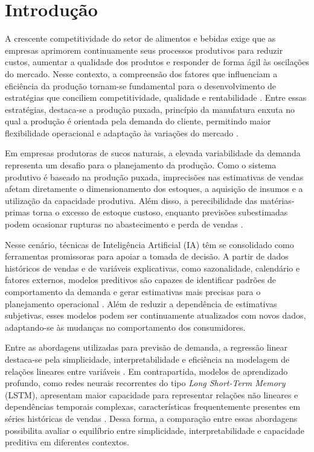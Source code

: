 \section{Introdução}
\label{sec-introducao}

A crescente competitividade do setor de alimentos e bebidas exige que as empresas aprimorem continuamente seus processos produtivos para reduzir custos, aumentar a qualidade dos produtos e responder de forma ágil às oscilações do mercado. Nesse contexto, a compreensão dos fatores que influenciam a eficiência da produção tornam-se fundamental para o desenvolvimento de estratégias que conciliem competitividade, qualidade e rentabilidade \cite{rochaimportancia}. Entre essas estratégias, destaca-se a produção puxada, princípio da manufatura enxuta no qual a produção é orientada pela demanda do cliente, permitindo maior flexibilidade operacional e adaptação às variações do mercado \cite{tovsanovic2021evaluation}.

Em empresas produtoras de sucos naturais, a elevada variabilidade da demanda representa um desafio para o planejamento da produção. Como o sistema produtivo é baseado na produção puxada, imprecisões nas estimativas de vendas afetam diretamente o dimensionamento dos estoques, a aquisição de insumos e a utilização da capacidade produtiva. Além disso, a perecibilidade das matérias-primas torna o excesso de estoque custoso, enquanto previsões subestimadas podem ocasionar rupturas no abastecimento e perda de vendas \cite{dandaro2015planejamento}.

Nesse cenário, técnicas de Inteligência Artificial (IA) têm se consolidado como ferramentas promissoras para apoiar a tomada de decisão. A partir de dados históricos de vendas e de variáveis explicativas, como sazonalidade, calendário e fatores externos, modelos preditivos são capazes de identificar padrões de comportamento da demanda e gerar estimativas mais precisas para o planejamento operacional \cite{douaioui2024machine}. Além de reduzir a dependência de estimativas subjetivas, esses modelos podem ser continuamente atualizados com novos dados, adaptando-se às mudanças no comportamento dos consumidores.

Entre as abordagens utilizadas para previsão de demanda, a regressão linear destaca-se pela simplicidade, interpretabilidade e eficiência na modelagem de relações lineares entre variáveis \cite{montgomery2021introduction}. Em contrapartida, modelos de aprendizado profundo, como redes neurais recorrentes do tipo \textit{Long Short-Term Memory} (LSTM), apresentam maior capacidade para representar relações não lineares e dependências temporais complexas, características frequentemente presentes em séries históricas de vendas \cite{james2023statistical}. Dessa forma, a comparação entre essas abordagens possibilita avaliar o equilíbrio entre simplicidade, interpretabilidade e capacidade preditiva em diferentes contextos.

